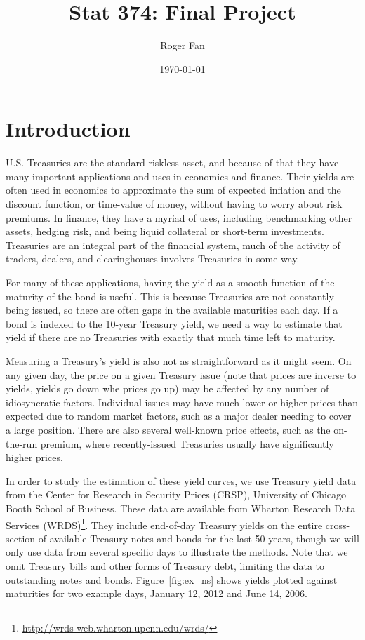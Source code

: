 \documentclass[12pt]{article}
\begin{document}

\title{Stat 374: Final Project}
\author{Roger Fan}
\date{\today}

\maketitle



\section{Introduction}

U.S. Treasuries are the standard riskless asset, and because of that they have many important applications and uses in economics and finance. Their yields are often used in economics to approximate the sum of expected inflation and the discount function, or time-value of money, without having to worry about risk premiums. In finance, they have a myriad of uses, including benchmarking other assets, hedging risk, and being liquid collateral or short-term investments. Treasuries are an integral part of the financial system, much of the activity of traders, dealers, and clearinghouses involves Treasuries in some way.

For many of these applications, having the yield as a smooth function of the maturity of the bond is useful. This is because Treasuries are not constantly being issued, so there are often gaps in the available maturities each day. If a bond is indexed to the 10-year Treasury yield, we need a way to estimate that yield if there are no Treasuries with exactly that much time left to maturity.

Measuring a Treasury's yield is also not as straightforward as it might seem. On any given day, the price on a given Treasury issue (note that prices are inverse to yields, yields go down whe prices go up) may be affected by any number of idiosyncratic factors. Individual issues may have much lower or higher prices than expected due to random market factors, such as a major dealer needing to cover a large position. There are also several well-known price effects, such as the on-the-run premium, where recently-issued Treasuries usually have significantly higher prices.

In order to study the estimation of these yield curves, we use Treasury yield data from the Center for Research in Security Prices (CRSP), University of Chicago Booth School of Business. These data are available from Wharton Research Data Services (WRDS)\footnote{\url{http://wrds-web.wharton.upenn.edu/wrds/}}. They include end-of-day Treasury yields on the entire cross-section of available Treasury notes and bonds for the last 50 years, though we will only use data from several specific days to illustrate the methods. Note that we omit Treasury bills and other forms of Treasury debt, limiting the data to outstanding notes and bonds. Figure~\ref{fig:ex_ns} shows yields plotted against maturities for two example days, January 12, 2012 and June 14, 2006.
\end{document}
